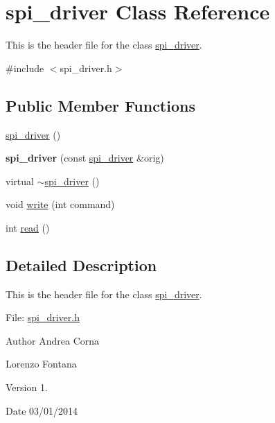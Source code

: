 \hypertarget{classspi__driver}{\section{spi\+\_\+driver Class Reference}
\label{classspi__driver}
}


This is the header file for the class \hyperlink{classspi__driver}{spi\+\_\+driver}.  




{\ttfamily \#include $<$spi\+\_\+driver.\+h$>$}

\subsection*{Public Member Functions}
\begin{DoxyCompactItemize}
\item 
\hyperlink{classspi__driver_aa2c69701e09a028d45dbfe4adb7c7e22}{spi\+\_\+driver} ()
\item 
\hypertarget{classspi__driver_a37a0cb85e0e049248b6dba1421c8d3ff}{{\bfseries spi\+\_\+driver} (const \hyperlink{classspi__driver}{spi\+\_\+driver} \&orig)}\label{classspi__driver_a37a0cb85e0e049248b6dba1421c8d3ff}

\item 
virtual \hyperlink{classspi__driver_a323ecbd0d8679efd3db99fbfd6486b44}{$\sim$spi\+\_\+driver} ()
\item 
void \hyperlink{classspi__driver_a146fb9b7ac218dae7a26fc5173aaf060}{write} (int command)
\item 
int \hyperlink{classspi__driver_aea08ab5aa1bff0169a0334241ddf2da0}{read} ()
\end{DoxyCompactItemize}


\subsection{Detailed Description}
This is the header file for the class \hyperlink{classspi__driver}{spi\+\_\+driver}. 

File\+: \hyperlink{spi__driver_8h_source}{spi\+\_\+driver.\+h} \begin{DoxyAuthor}{Author}
Andrea Corna 

Lorenzo Fontana 
\end{DoxyAuthor}
\begin{DoxyVersion}{Version}
1. 
\end{DoxyVersion}
\begin{DoxyDate}{Date}
03/01/2014 
\end{DoxyDate}


